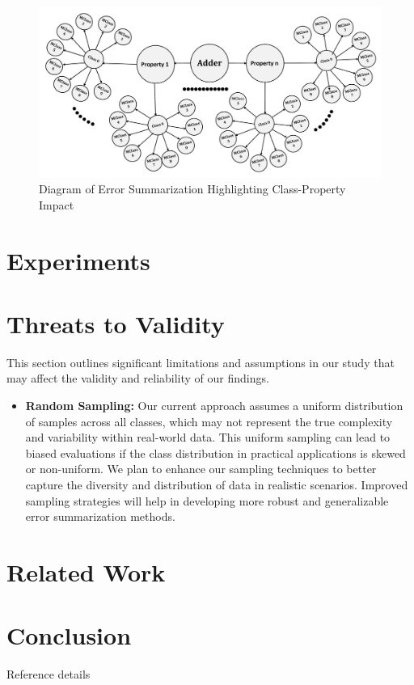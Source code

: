 \documentclass[10pt, conference, a4paper, final]{IEEEtran}
\begin{document}
\begin{figure}[H]
    \centering
    \includegraphics[width=\linewidth]{paper_images/step5.pdf}
    \caption{Diagram of Error Summarization Highlighting Class-Property Impact}
    \label{fig:error-summarization}
\end{figure}





\section{Experiments}


\section{Threats to Validity}

This section outlines significant limitations and assumptions in our study that may affect the validity and reliability of our findings.

\begin{itemize}
    \item \textbf{Random Sampling:} Our current approach assumes a uniform distribution of samples across all classes, which may not represent the true complexity and variability within real-world data. This uniform sampling can lead to biased evaluations if the class distribution in practical applications is skewed or non-uniform. We plan to enhance our sampling techniques to better capture the diversity and distribution of data in realistic scenarios. Improved sampling strategies will help in developing more robust and generalizable error summarization methods.
\end{itemize}


\section{Related Work}

\section{Conclusion}

\begin{thebibliography}{01}
     Reference details
\end{thebibliography}
\end{document}
